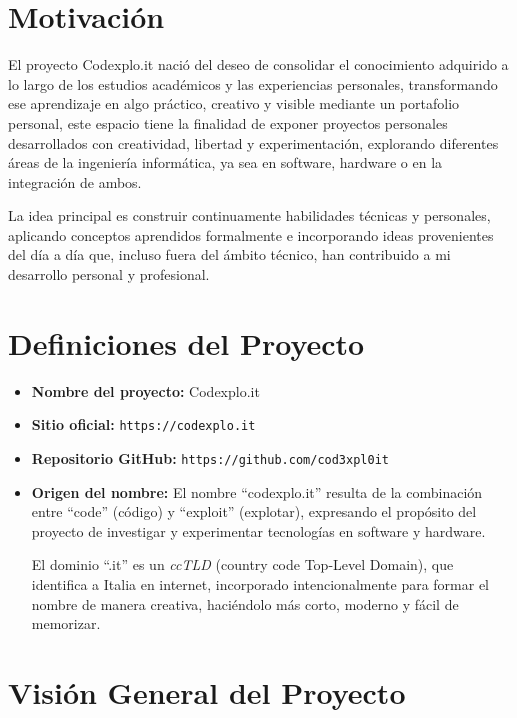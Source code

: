 \documentclass[10pt, a4paper, oneside]{article}
\begin{document}
\section{Motivación}

El proyecto Codexplo.it nació del deseo de consolidar el conocimiento adquirido a lo largo de los estudios académicos y las experiencias personales, transformando ese aprendizaje en algo práctico, creativo y visible mediante un portafolio personal, este espacio tiene la finalidad de exponer proyectos personales desarrollados con creatividad, libertad y experimentación, explorando diferentes áreas de la ingeniería informática, ya sea en software, hardware o en la integración de ambos.\newline

La idea principal es construir continuamente habilidades técnicas y personales, aplicando conceptos aprendidos formalmente e incorporando ideas provenientes del día a día que, incluso fuera del ámbito técnico, han contribuido a mi desarrollo personal y profesional.\newpage

\section{Definiciones del Proyecto}

\begin{itemize}
  \item \textbf{Nombre del proyecto:} Codexplo.it  
  \item \textbf{Sitio oficial:} \texttt{https://codexplo.it}  
  \item \textbf{Repositorio GitHub:} \texttt{https://github.com/cod3xpl0it}  
  \item \textbf{Origen del nombre:}  
  El nombre “codexplo.it” resulta de la combinación entre “code” (código) y “exploit” (explotar), expresando el propósito del proyecto de investigar y experimentar tecnologías en software y hardware.\newline
  
  El dominio “.it” es un \textit{ccTLD} (country code Top-Level Domain), que identifica a Italia en internet, incorporado intencionalmente para formar el nombre de manera creativa, haciéndolo más corto, moderno y fácil de memorizar.  
\end{itemize}

\section{Visión General del Proyecto}
\end{document}
